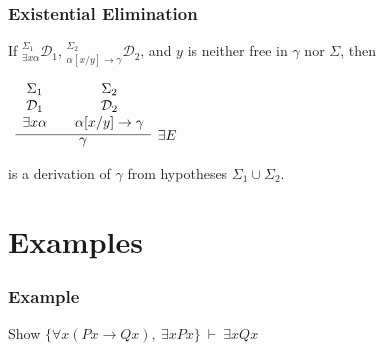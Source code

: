 \documentclass{beamer}
\theoremstyle{indentDefn} \newtheorem{defn}[]{Definition}
\begin{document}
\begin{frame}
	\frametitle{Existential Elimination}
	
	If $^{\Sigma_{1}}_{\exists x \alpha}\mathcal{D}_{1}$, $^{\Sigma_{2}}_{\alpha[x/y]\rightarrow\gamma}\mathcal{D}_{2}$, and $y$ is neither free in $\gamma$ nor $\Sigma$, then
	
	\begin{center}
	$\begin{array}{ c }
	
	\infer[\exists E]{\gamma}
	{
		\begin{array}{c} \Sigma_{1}  \\ \mathcal{D}_{1} \\ \exists x \alpha \end{array}
		& 
		\begin{array}{c} \Sigma_{2}  \\ \mathcal{D}_{2} \\ \alpha[x/y]\rightarrow\gamma \end{array}				
	}	
	
	\end{array}$
	\end{center}

	is a derivation of $\gamma$ from hypotheses $\Sigma_{1} \cup \Sigma_{2}$. 
	
	
\end{frame}

\section{Examples}

\begin{frame}
	\frametitle{Example}
	
	Show $\{\forall x (Px \rightarrow Qx), \ \exists x Px\} \ \vdash \ \exists x Qx$
	
	
	\vspace{6cm}
	
\end{frame}
\end{document}
